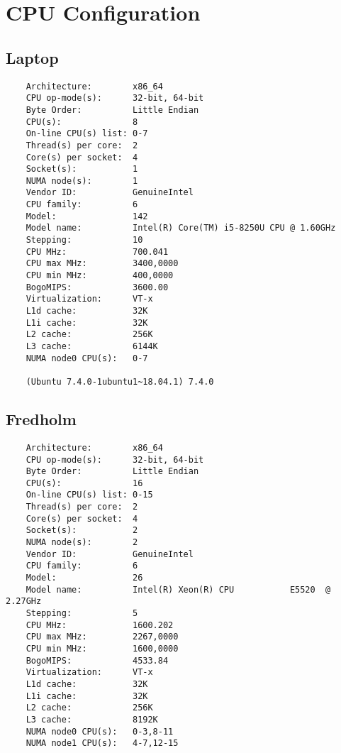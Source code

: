 \section{CPU Configuration}
\subsection{Laptop}
\begin{verbatim}
    Architecture:        x86_64
    CPU op-mode(s):      32-bit, 64-bit
    Byte Order:          Little Endian
    CPU(s):              8
    On-line CPU(s) list: 0-7
    Thread(s) per core:  2
    Core(s) per socket:  4
    Socket(s):           1
    NUMA node(s):        1
    Vendor ID:           GenuineIntel
    CPU family:          6
    Model:               142
    Model name:          Intel(R) Core(TM) i5-8250U CPU @ 1.60GHz
    Stepping:            10
    CPU MHz:             700.041
    CPU max MHz:         3400,0000
    CPU min MHz:         400,0000
    BogoMIPS:            3600.00
    Virtualization:      VT-x
    L1d cache:           32K
    L1i cache:           32K
    L2 cache:            256K
    L3 cache:            6144K
    NUMA node0 CPU(s):   0-7

    (Ubuntu 7.4.0-1ubuntu1~18.04.1) 7.4.0

\end{verbatim}\textbf{}
\newpage
\subsection{Fredholm}
\begin{verbatim}
    Architecture:        x86_64
    CPU op-mode(s):      32-bit, 64-bit
    Byte Order:          Little Endian
    CPU(s):              16
    On-line CPU(s) list: 0-15
    Thread(s) per core:  2
    Core(s) per socket:  4
    Socket(s):           2
    NUMA node(s):        2
    Vendor ID:           GenuineIntel
    CPU family:          6
    Model:               26
    Model name:          Intel(R) Xeon(R) CPU           E5520  @ 2.27GHz
    Stepping:            5
    CPU MHz:             1600.202
    CPU max MHz:         2267,0000
    CPU min MHz:         1600,0000
    BogoMIPS:            4533.84
    Virtualization:      VT-x
    L1d cache:           32K
    L1i cache:           32K
    L2 cache:            256K
    L3 cache:            8192K
    NUMA node0 CPU(s):   0-3,8-11
    NUMA node1 CPU(s):   4-7,12-15

\end{verbatim}
